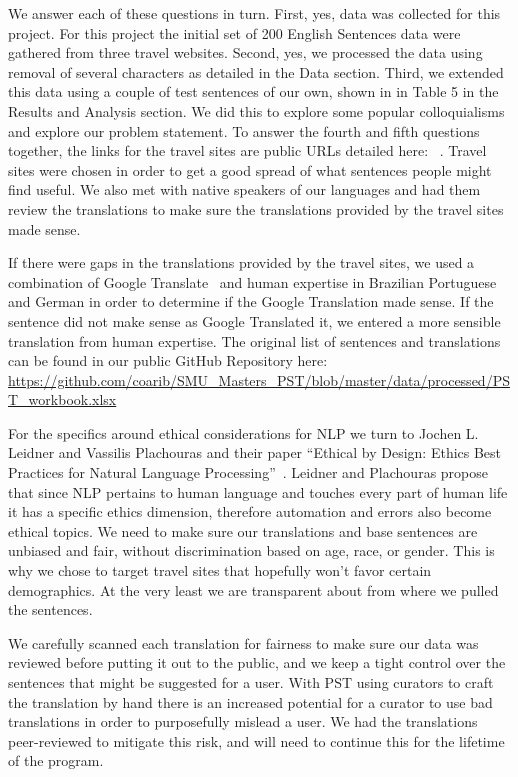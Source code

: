 \documentclass[runningheads]{llncs}
\begin{document}
We answer each of these questions in turn. First, yes, data was collected for this project. For this project the initial set of 200 English Sentences data were gathered from three travel websites. Second, yes, we processed the data using removal of several characters as detailed in the Data section. Third, we extended this data using a couple of test sentences of our own, shown in in Table 5 in the Results and Analysis section. We did this to explore some popular colloquialisms and explore our problem statement. To answer the fourth and fifth questions together, the links for the travel sites are public URLs detailed here: ~\cite{ref_url9,ref_url4,ref_url10}. Travel sites were chosen in order to get a good spread of what sentences people might find useful. We also met with native speakers of our languages and had them review the translations to make sure the translations provided by the travel sites made sense. 

If there were gaps in the translations provided by the travel sites, we used a combination of Google Translate~\cite{ref_url3} and human expertise in Brazilian Portuguese and German in order to determine if the Google Translation made sense. If the sentence did not make sense as Google Translated it, we entered a more sensible translation from human expertise. The original list of sentences and translations can be found in our public GitHub Repository here:
\url{https://github.com/coarib/SMU_Masters_PST/blob/master/data/processed/PST_workbook.xlsx}

For the specifics around ethical considerations for NLP we turn to Jochen L. Leidner and Vassilis Plachouras and their paper ``Ethical by Design: Ethics Best Practices for Natural Language Processing''~\cite{ref_url17}.  Leidner and Plachouras propose that since NLP pertains to human language and touches every part of human life it has a specific ethics dimension, therefore automation and errors also become ethical topics. We need to make sure our translations and base sentences are unbiased and fair, without discrimination based on age, race, or gender. This is why we chose to target travel sites that hopefully won't favor certain demographics. At the very least we are transparent about from where we pulled the sentences.

We carefully scanned each translation for fairness to make sure our data was reviewed before putting it out to the public, and we keep a tight control over the sentences that might be suggested for a user. With PST using curators to craft the translation by hand there is an increased potential for a curator to use bad translations in order to purposefully mislead a user. We had the translations peer-reviewed to mitigate this risk, and will need to continue this for the lifetime of the program.
\end{document}
